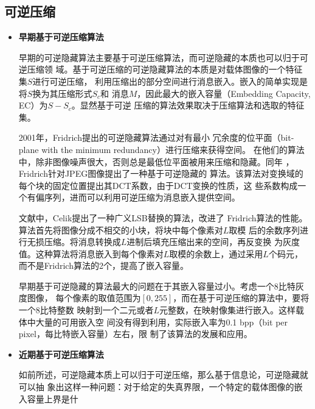 \subsection{可逆压缩}
\begin{itemize}
  \setlength{\parindent}{2em}
  \vspace{-2mm}
  \item \textbf{早期基于可逆压缩算法}
    \vspace{-2mm}
    \par
    早期的可逆隐藏算法主要基于可逆压缩算法，而可逆隐藏的本质也可以归于可逆压缩领
    域。基于可逆压缩的可逆隐藏算法的本质是对载体图像的一个特征集$S$进行可逆压缩，
    利用压缩出的部分空间进行消息嵌入。嵌入的简单实现是将$S$换为其压缩形式$S_c$和
    消息$M$，因此最大的嵌入容量（Embedding Capacity, EC）为$S-S_c$。显然基于可逆
    压缩的算法效果取决于压缩算法和选取的特征集。
    \par
    2001年\cite{fridrich2001invertible}，Fridrich提出的可逆隐藏算法通过对有最小
    冗余度的位平面（bit-plane with the minimum redundancy）进行压缩来获得空间。
    在他们的算法中，除非图像噪声很大，否则总是最低位平面被用来压缩和隐藏。同年
    \cite{fridrich2001invertible2}，Fridrich针对JPEG图像提出了一种基于可逆隐藏的
    算法。该算法对变换域的每个块的固定位置提出其DCT系数，由于DCT变换的性质，这
    些系数构成一个有偏序列，进而可以利用可逆压缩为消息嵌入提供空间。
    \par
    文献\cite{celik2005lossless}中，Celik提出了一种广义LSB替换的算法，改进了
    Fridrich算法的性能。算法首先将图像分成不相交的小块，将块中每个像素对$L$取模
    后的余数序列进行无损压缩。将消息转换成$L$进制后填充压缩出来的空间，再反变换
    为灰度值。这种算法将消息嵌入到每个像素对$L$取模的余数上，通过采用$L$个码元，
    而不是Fridrich算法的2个，提高了嵌入容量。
    \par
    早期基于可逆隐藏的算法最大的问题在于其嵌入容量过小。考虑一个8比特灰度图像，
    每个像素的取值范围为$[0, 255]$，而在基于可逆压缩的算法中，要将一个8比特整数
    映射到一个二元或者$L$元整数，在映射像集进行嵌入。这样载体中大量的可用嵌入空
    间没有得到利用，实际嵌入率为0.1 bpp（bit per pixel，每比特嵌入容量）左右，限
    制了该算法的发展和应用。\\
  \vspace{-10mm}
  \item \textbf{近期基于可逆压缩算法}
    \vspace{-2mm}
    \par
    如前所述，可逆隐藏本质上可以归于可逆压缩，那么基于信息论，可逆隐藏就可以抽
    象出这样一种问题：对于给定的失真界限，一个特定的载体图像的嵌入容量上界是什

\end{itemize}

